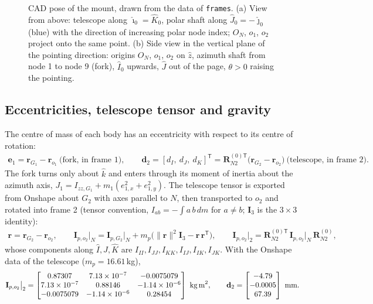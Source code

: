 \documentclass[10pt,a4paper]{article}
\numberwithin{equation}{section}
\begin{document}
\begin{figure}[H]
{}
\caption{CAD pose of the mount, drawn from the data of \texttt{frames}. (a) View from above: telescope along $\hat\imath_0 = \hat K_0$, polar shaft along $\hat J_0 = -\hat\jmath_0$ (blue) with the direction of increasing polar node index; $O_N$, $o_1$, $o_2$ project onto the same point. (b) Side view in the vertical plane of the pointing direction: origins $O_N$, $o_1$, $o_2$ on $\hat z$, azimuth shaft from node 1 to node 9 (fork), $\hat I_0$ upwards, $\hat J$ out of the page, $\theta>0$ raising the pointing.}\label{fig:frames}
\end{figure}

\subsection{Eccentricities, telescope tensor and gravity}\label{subsec:eccentricity}
The centre of mass of each body has an eccentricity with respect to its centre of rotation:
\begin{gather}
\mathbf e_1 = \mathbf r_{G_1} - \mathbf r_{o_1}\ \text{(fork, in frame 1)}, \qquad \mathbf d_2 = [d_I,\ d_J,\ d_K]^{\mathsf T} = \mathbf R_{N2}^{(0)\mathsf T}\bigl(\mathbf r_{G_2} - \mathbf r_{o_2}\bigr)\ \text{(telescope, in frame 2)}.
\end{gather}
The fork turns only about $\hat k$ and enters through its moment of inertia about the azimuth axis, $J_1 = I_{zz,G_1} + m_1(e_{1,x}^2 + e_{1,y}^2)$. The telescope tensor is exported from Onshape about $G_2$ with axes parallel to $N$, then transported to $o_2$ and rotated into frame 2 (tensor convention, $I_{ab} = -\int a\,b\,dm$ for $a \ne b$; $\mathbf I_3$ is the $3\times3$ identity):
\begin{gather}
\mathbf r = \mathbf r_{G_2} - \mathbf r_{o_2},\qquad \mathbf I_{p,o_2}\big|_N = \mathbf I_{p,G_2}\big|_N + m_p\bigl(\|\mathbf r\|^2\mathbf I_3 - \mathbf r\,\mathbf r^{\mathsf T}\bigr),\qquad \mathbf I_{p,o_2}\big|_2 = \mathbf R_{N2}^{(0)\mathsf T}\,\mathbf I_{p,o_2}\big|_N\,\mathbf R_{N2}^{(0)},
\end{gather}
whose components along $\hat I, \hat J, \hat K$ are $I_{II}, I_{JJ}, I_{KK}, I_{IJ}, I_{IK}, I_{JK}$. With the Onshape data of the telescope ($m_p = 16.61$\,kg),
\begin{gather}
\mathbf I_{p,o_2}\big|_2 = \begin{bmatrix}0.87307 & 7.13\times10^{-7} & -0.0075079 \\ 7.13\times10^{-7} & 0.88146 & -1.14\times10^{-6} \\ -0.0075079 & -1.14\times10^{-6} & 0.28454\end{bmatrix}\ \text{kg\,m}^2,\qquad \mathbf d_2 = \begin{bmatrix}-4.79\\ -0.0005\\ 67.39\end{bmatrix}\ \text{mm}.
\end{gather}
\end{document}
